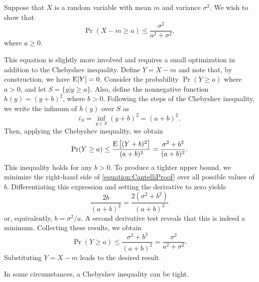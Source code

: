 \begin{example}
Suppose that $X$ is a random variable with mean $m$ and variance $\sigma^2$.
We wish to show that
\begin{equation*}
\Pr ( X - m \geq a ) \leq \frac{\sigma^2}{a^2 + \sigma^2},
\end{equation*}
where $a \geq 0$.

This equation is slightly more involved and requires a small optimization in addition to the Chebyshev inequality.
Define $Y = X - m$ and note that, by construction, we have $\mathrm{E} [Y] = 0$.
Consider the probability $\Pr (Y \geq a)$ where $a > 0$, and let $S = \{ y | y \geq a \}$.
Also, define the nonnegative function $h(y) = (y + b)^2$, where $b > 0$.
Following the steps of the Chebyshev inequality, we write the infimum of $h(y)$ over $S$ as
\begin{equation*}
i_S = \inf_{y \in S} (y + b)^2 = (a + b)^2 .
\end{equation*}
Then, applying the Chebyshev inequality, we obtain
\begin{equation} \label{equation:CantelliProof}
\Pr (Y \geq a) \leq \frac{ \mathrm{E} \left[ (Y + b)^2 \right] }{(a + b)^2}
= \frac{ \sigma^2 + b^2 }{ (a + b)^2 } .
\end{equation}
This inequality holds for any $b > 0$.
To produce a tighter upper bound, we minimize the right-hand side of \eqref{equation:CantelliProof} over all possible values of $b$.
Differentiating this expression and setting the derivative to zero yields
\begin{equation*}
\frac{ 2 b }{(a + b)^2 } = \frac{ 2 \left( \sigma^2 + b^2 \right) }{(a + b)^3}
\end{equation*}
or, equivalently, $b = \sigma^2 / a$.
A second derivative test reveals that this is indeed a minimum.
Collecting these results, we obtain
\begin{equation*}
\Pr (Y \geq a) \leq \frac{ \sigma^2 + b^2 }{ (a + b)^2 }
= \frac{ \sigma^2 }{ a^2 + \sigma^2 } .
\end{equation*}
Substituting $Y = X - m$ leads to the desired result.
\end{example}

In some circumstances, a Chebyshev inequality can be tight.


